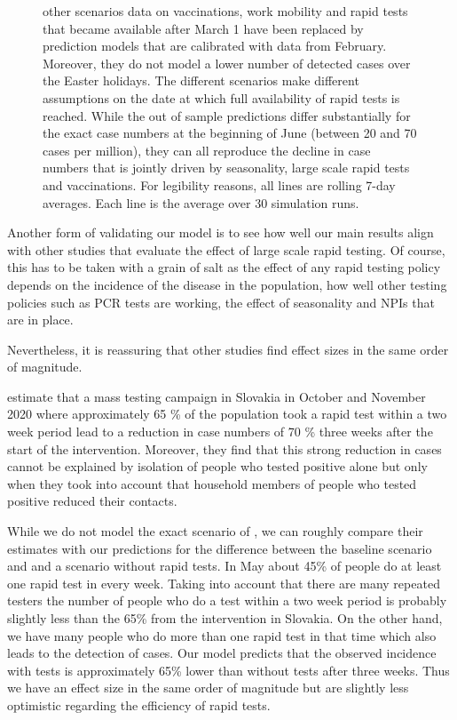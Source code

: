 \begin{figure}[ht]
{        other scenarios data on vaccinations, work mobility and rapid tests that became
        available after March 1 have been replaced by prediction models that are calibrated
        with data from February. Moreover, they do not model a lower number of detected cases
        over the Easter holidays. The different scenarios make different assumptions on the
        date at which full availability of rapid tests is reached. While the out of sample
        predictions differ substantially for the exact case numbers at the beginning of June
        (between 20 and 70 cases per million), they can all reproduce the decline in case
        numbers that is jointly driven by seasonality, large scale rapid tests and
        vaccinations. For legibility reasons, all lines are rolling 7-day averages. Each line
        is the average over 30 simulation runs.}
\end{figure}

Another form of validating our model is to see how well our main results align with
other studies that evaluate the effect of large scale rapid testing. Of course, this has
to be taken with a grain of salt as the effect of any rapid testing policy depends on
the incidence of the disease in the population, how well other testing policies such as
PCR tests are working, the effect of seasonality and NPIs that are in place.

Nevertheless, it is reassuring that other studies find effect sizes in the same order of
magnitude.

\citet{Pavelka2021} estimate that a mass testing campaign in Slovakia in October and
November 2020 where approximately 65 \% of the population took a rapid test within a two
week period lead to a reduction in case numbers of 70 \% three weeks after the start of
the intervention. Moreover, they find that this strong reduction in cases cannot be
explained by isolation of people who tested positive alone but only when they took into
account that household members of people who tested positive reduced their contacts.

While we do not model the exact scenario of \citet{Pavelka2021}, we can roughly compare
their estimates with our predictions for the difference between the baseline scenario
and and a scenario without rapid tests. In May about 45\% of people do at least one
rapid test in every week. Taking into account that there are many repeated testers the
number of people who do a test within a two week period is probably slightly less than
the 65\% from the intervention in Slovakia. On the other hand, we have many people who
do more than one rapid test in that time which also leads to the detection of cases. Our
model predicts that the observed incidence with tests is approximately 65\% lower than
without tests after three weeks. Thus we have an effect size in the same order of
magnitude but are slightly less optimistic regarding the efficiency of rapid tests.

